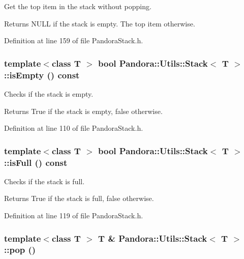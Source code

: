 Get the top item in the stack without popping. \begin{DoxyReturn}{Returns}
NULL if the stack is empty. The top item otherwise. 
\end{DoxyReturn}


Definition at line 159 of file PandoraStack.h.\hypertarget{classPandora_1_1Utils_1_1Stack_a163441b950b324b28db471e793e20c62}{
\subsubsection[{isEmpty}]{\setlength{\rightskip}{0pt plus 5cm}template$<$class T $>$ bool {\bf Pandora::Utils::Stack}$<$ T $>$::isEmpty () const}}
\label{classPandora_1_1Utils_1_1Stack_a163441b950b324b28db471e793e20c62}


Checks if the stack is empty. \begin{DoxyReturn}{Returns}
True if the stack is empty, false otherwise. 
\end{DoxyReturn}


Definition at line 110 of file PandoraStack.h.\hypertarget{classPandora_1_1Utils_1_1Stack_aceefd2e5cbc10a11bcbaa3d73cd78bbc}{
\subsubsection[{isFull}]{\setlength{\rightskip}{0pt plus 5cm}template$<$class T $>$ bool {\bf Pandora::Utils::Stack}$<$ T $>$::isFull () const}}
\label{classPandora_1_1Utils_1_1Stack_aceefd2e5cbc10a11bcbaa3d73cd78bbc}


Checks if the stack is full. \begin{DoxyReturn}{Returns}
True if the stack is full, false otherwise. 
\end{DoxyReturn}


Definition at line 119 of file PandoraStack.h.\hypertarget{classPandora_1_1Utils_1_1Stack_a2ef38d630c91e48b425799887621433f}{
\subsubsection[{pop}]{\setlength{\rightskip}{0pt plus 5cm}template$<$class T $>$ T \& {\bf Pandora::Utils::Stack}$<$ T $>$::pop ()}}
\label{classPandora_1_1Utils_1_1Stack_a2ef38d630c91e48b425799887621433f}


